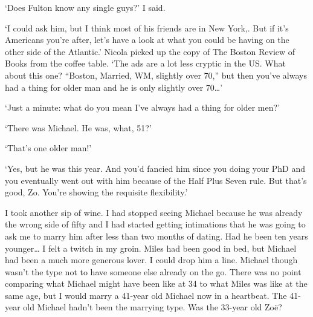 `Does Fulton know any single guys?' I said.

`I could ask him, but I think most of his friends are in New York,. But if it's Americans you're after, let's have a look at what you could be having on the other side of the Atlantic.' Nicola picked up
the copy of {\twelvesl The Boston Review of Books\/} from the coffee
table. `The ads are a lot less cryptic in the US. What
about this one? ``Boston, Married, WM, slightly over 70,'' but then
you've always had a thing for older man and he is only {\twelveit
slightly\/} over 70{\dots}'

`Just a minute: what do you mean I've always had a thing for older men?'

`There was Michael. He was, what, 51?'

`That's {\twelveit one\/} older man!'

`Yes, but he was {\twelveit this\/} year. And you'd fancied him since you doing your PhD and you eventually went out with him because of the Half Plus Seven rule. But that's good, Zo. You're showing the requisite flexibility.'

I took another sip of wine. I had stopped seeing Michael because he was already the wrong side of fifty and I had started getting intimations that he was going to ask me to marry him after less than two months of dating. Had he been ten years younger{\dots} I felt a twitch in my groin. Miles had been good in bed, but Michael had been a much more generous lover. I could drop him a line. Michael though wasn't the type not to have someone else already on the go. There was no point comparing what Michael might have been like at 34 to what Miles was like at the same age, but I would marry a 41-year old Michael now in a heartbeat. The 41-year old Michael hadn't been the marrying type. Was the 33-year old Zoë?


